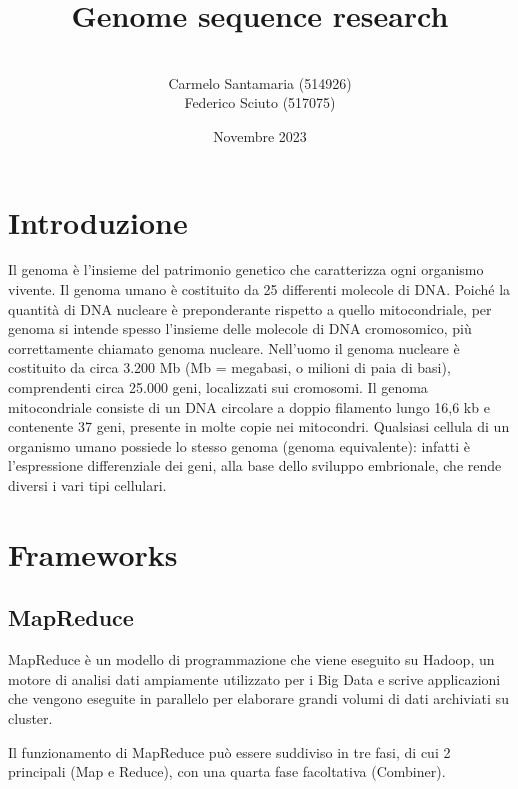 \documentclass{article}
\title{Genome sequence research}
\author{\\Carmelo Santamaria (514926) \\ Federico Sciuto (517075)}
\date{Novembre 2023}
\begin{document}
    
    \maketitle
    
    \vspace{10pt}
    
    \section{Introduzione}
    Il genoma è l’insieme del patrimonio genetico che caratterizza ogni organismo vivente.
    Il genoma umano è costituito da 25 differenti molecole di DNA. Poiché la quantità di DNA nucleare è preponderante rispetto a quello mitocondriale, per genoma si intende spesso l’insieme delle molecole di DNA cromosomico, più correttamente chiamato genoma nucleare. Nell'uomo il genoma nucleare è costituito da circa 3.200 Mb (Mb = megabasi, o milioni di paia di basi), comprendenti circa 25.000 geni, localizzati sui cromosomi. Il genoma mitocondriale consiste di un DNA circolare a doppio filamento lungo 16,6 kb e contenente 37 geni, presente in molte copie nei mitocondri. Qualsiasi cellula di un organismo umano possiede lo stesso genoma (genoma equivalente): infatti è l’espressione differenziale dei geni, alla base dello sviluppo embrionale, che rende diversi i vari tipi cellulari.
    
    \vspace{20pt}
    
    \section{Frameworks}
    
    \subsection{MapReduce}
    MapReduce è un modello di programmazione che viene eseguito su Hadoop, un motore di analisi dati ampiamente utilizzato per i Big Data e scrive applicazioni che vengono eseguite in parallelo per elaborare grandi volumi di dati archiviati su cluster.
    
    Il funzionamento di MapReduce può essere suddiviso in tre fasi, di cui 2 principali (Map e Reduce), con una quarta fase facoltativa (Combiner).
    
\end{document}
